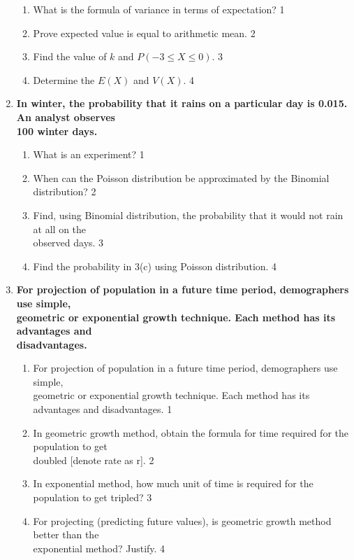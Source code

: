 \documentclass{article}
\begin{document}
\begin{enumerate}
  \begin{enumerate}
    \item
	What is the formula of variance in terms of expectation? \hfill 1
    \item
    	Prove expected value is equal to arithmetic mean. \hfill 2
    \item
    	Find the value of $k$ and $P(-3 \le X \le 0)$. \hfill 3
     \item
     	Determine the $E(X)$ and $V(X)$. \hfill 4
  \end{enumerate}

  \item
  \textbf{In winter, the probability that it rains on a particular day is 0.015. An analyst observes \\ 100 winter days.}
 
  \begin{enumerate}
    \item
	What is an experiment? \hfill 1
    \item
    	When can the Poisson distribution be approximated by the Binomial distribution? \hfill 2
    \item
    	Find, using Binomial distribution, the probability that  it would not rain at all on the \\ observed days. \hfill 3
     \item
     	Find the probability in 3(c) using Poisson distribution.  \hfill 4
  \end{enumerate}

 \item
  \textbf{For projection of population in a future time period, demographers use simple, \\ geometric or exponential growth technique. Each method has its advantages and \\ disadvantages.}

  \begin{enumerate}
    \item
	For projection of population in a future time period, demographers use simple, \\ geometric or exponential growth technique. Each method has its advantages and disadvantages. \hfill 1
    \item
    	In geometric growth method, obtain the formula for time required for the population to get \\ doubled [denote rate as r]. \hfill 2
    \item
    	In exponential method, how much unit of time is required for the population to get tripled?  \hfill 3
     \item
     	For projecting (predicting future values), is geometric growth method better than the \\ exponential method? Justify.  \hfill 4
  \end{enumerate}
  
\end{enumerate}
\end{document}
